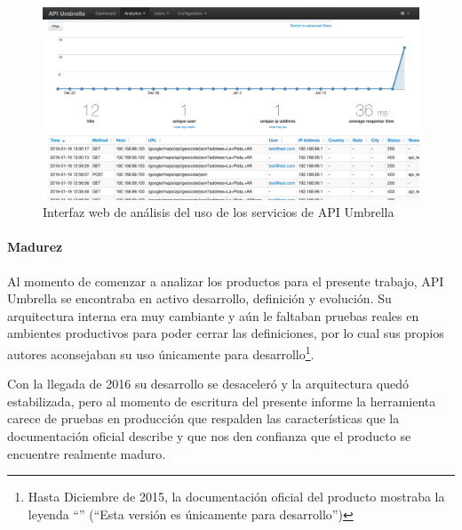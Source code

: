 \begin{figure}
  \includegraphics[width=\linewidth]{src/images/03-capitulo-3/tecnologias/api-umbrella/analytics.png}
  \caption{Interfaz web de análisis del uso de los servicios de API Umbrella}
  \label{fig:api-umbrella-analytics}
\end{figure}

\paragraph{Madurez}

Al momento de comenzar a analizar los productos para el presente trabajo, API Umbrella se encontraba en activo desarrollo, definición y evolución. Su arquitectura interna era muy cambiante y aún le faltaban pruebas reales en ambientes productivos para poder cerrar las definiciones, por lo cual sus propios autores aconsejaban su uso únicamente para desarrollo\footnote{Hasta Diciembre de 2015, la documentación oficial del producto mostraba la leyenda ``'' (``Esta versión es únicamente para desarrollo'')}.

Con la llegada de 2016 su desarrollo se desaceleró y la arquitectura quedó estabilizada, pero al momento de escritura del presente informe la herramienta carece de pruebas en producción que respalden las características que la documentación oficial describe y que nos den confianza que el producto se encuentre realmente maduro.
